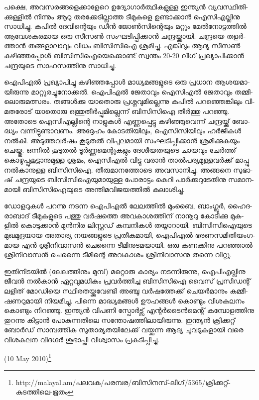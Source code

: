 ­പ­ക്ഷെ, അവ­സ­ര­ങ്ങ­ളെ­ക്കാ­ളേ­റെ ഉദ്യോ­ഗാര്‍­ത്ഥി­ക­ളു­ള്ള ഇന്ത്യന്‍ വ്യ­വ­സ്ഥി­തി­ക്കു­ള്ളില്‍ നി­ന്നും ആറു തര­ക്കേ­ടി­ല്ലാ­ത്ത 
­ടീ­മു­ക­ളെ ഉണ്ടാ­ക്കാന്‍ ഐസി­എ­ല്ലി­നു സാ­ധി­ച്ചു. കപില്‍ ദേ­വി­ന്റെ­യും ഡീന്‍ ജോണ്‍­സി­ന്റെ­യും മറ്റും മേല്‍­നോ­ട്ട­ത്തില്‍ 
ആവേ­ശ­ക­ര­മായ ഒരു സീ­സണ്‍ സം­ഘ­ടി­പ്പി­ക്കാന്‍ ചന്ദ്ര­യ്ക്കാ­യി. ചന്ദ്ര­യെ തളര്‍­ത്താന്‍ തങ്ങ­ളാ­ലാ­വും വി­ധം ബി­സി­സിഐ 
ശ്ര­മി­ച്ചു. എങ്കി­ലും ആദ്യ സീ­സണ്‍ കഴി­ഞ്ഞ­പ്പോള്‍ ബി­സി­സി­ഐ­യെ­ക്കൊ­ണ്ട് സ്വ­ന്തം 20-20 ലീ­ഗ് പ്ര­ഖ്യാ­പി­ക്കാന്‍ ചന്ദ്ര­യു­ടെ 
സാ­ഹ­സ­ത്തി­നു സാ­ധി­ച്ചു­.



ഐപിഎല്‍ പ്ര­ഖ്യാ­പി­ച്ചു കഴി­ഞ്ഞ­പ്പോള്‍ മാ­ധ്യ­മ­ങ്ങ­ളു­ടെ ഒരു പ്ര­ധാന ആശ­യ­മാ­യി­രു­ന്നു മാ­റ്റു­ര­ച്ചു­നോ­ക്കല്‍. ഐപി­എല്‍ 
ജേ­താ­വും ഐ­സി­എല്‍ ജേ­താ­വും തമ്മി­ലൊ­രു­മ­ത്സ­രം. തങ്ങള്‍­ക്കു യാ­തൊ­രു പ്ര­ശ്ന­വു­മി­ല്ലെ­ന്നു കപില്‍ പറ­ഞ്ഞെ­ങ്കി­ലും 
വി­മ­ത­രോ­ട് യാ­തൊ­രു ഒത്തു­തീര്‍­പ്പു­മി­ല്ലെ­ന്ന് ബി­സി­സിഐ തീര്‍­ത്തു പറ­ഞ്ഞു. അതോ­ടെ ഐസി­എ­ല്ലി­ന്റെ നാ­ളു­കള്‍ 
എണ്ണ­പ്പെ­ട്ടു കഴി­ഞ്ഞു­വെ­ന്ന് ചന്ദ്ര­യ്ക്ക് ബോ­ദ്ധ്യം വന്നി­ട്ടു­ണ്ടാ­വ­ണം. അദ്ദേ­ഹം കോ­ട­തി­യി­ലും, ഐസി­സി­യി­ലും ഹര്‍­ജി­കള്‍ 
നല്‍­കി. അടു­ത്ത­വര്‍­ഷം കൂ­ടു­തല്‍ വി­പു­ല­മാ­യി സം­ഘ­ടി­പ്പി­ക്കാന്‍ ശ്ര­മി­ക്കു­ക­യും ചെ­യ്തു. ഒന്നില്‍ കൂ­ടു­തല്‍ ടൂര്‍­ണ്ണ­മെ­ന്റു­ക­ളും 
ദേ­ശീ­യ­ത­യു­ടെ ചാ­യ­വും ചേര്‍­ത്ത് കൊ­ഴു­പ്പു­കൂ­ട്ടാ­നു­മു­ള്ള ശ്ര­മം, ഐസി­എല്‍ വി­ട്ടു വരാന്‍ താല്‍­പ­ര്യ­മു­ള്ള­വര്‍­ക്ക് മാ­പ്പു 
നല്‍­കാ­നു­ള്ള ബി­സി­സി­ഐ. തീ­രു­മാ­ന­ത്തോ­ടെ അവ­സാ­നി­ച്ചു. അങ്ങ­നെ സു­ഭാ­ഷ് ചന്ദ്ര­യു­ടെ ബി­സി­സി­ഐ­യു­മാ­യു­ള്ള 
പോ­രാ­ട്ടം കെ­റി പാര്‍­ക്ക­റു­ടേ­തി­നു സമാ­ന­മാ­യി ബി­സി­സി­ഐ­യു­ടെ അന്തി­മ­വി­ജ­യ­ത്തില്‍ കലാ­ശി­ച്ചു.

­ഡോ­ള­റു­കള്‍ പറ­ന്നു നട­ന്ന ഐപി­എല്‍ ലേ­ല­ത്തില്‍ മും­ബൈ, ബാം­ഗ്ലൂര്‍, ഹൈ­ദ­രാ­ബാ­ദ് ടീ­മു­ക­ളു­ടെ പത്തു വര്‍­ഷ­ത്തെ 
അവ­കാ­ശ­ത്തി­ന് നാ­നൂ­റു കോ­ടി­ക്കു മു­ക­ളില്‍ കൊ­ടു­ക്കാന്‍ മുന്‍­നിര ലി­സ്റ്റ­ഡ് കമ്പ­നി­കള്‍ തയ്യാ­റാ­യി. ബി­സി­സി­ഐ­യു­ടെ 
മു­ഖ­മു­ദ്ര­യായ അതാ­ര്യ നയ­ങ്ങ­ളു­ടെ പ്ര­തീ­ക­മാ­യി, ഐപി­എല്‍ ഭര­ണ­സ­മി­തി­യം­ഗ­മായ എന്‍ ശ്രീ­നി­വാ­സന്‍ ചെ­ന്നൈ 
ടീ­മി­നു­ട­മ­യാ­യി. ഒരു കണ­ക്കി­നു പറ­ഞ്ഞാല്‍ ശ്രീ­നി­വാ­സന്‍ ചെ­ന്നൈ ടീ­മി­ന്റെ അവ­കാ­ശം ശ്രീ­നി­വാ­സ­നു തന്നെ വി­റ്റു.

ഇ­തി­നി­ട­യില്‍ (ലേ­ല­ത്തി­നും മു­മ്പ്) മറ്റൊ­രു കാ­ര്യം നട­ന്നി­രു­ന്നു, ഐപി­എ­ല്ലി­നു ജീ­വന്‍ നല്‍­കാന്‍ ഏറ്റ­വു­മ­ധി­കം പ്ര­വര്‍­ത്തി­ച്ച 
ബി­സി­സിഐ വൈ­സ് പ്ര­സി­ഡ­ന്റ് ലളി­ത് മോ­ഡി­യെ സ്ഥി­ര­ത­യ്ക്കു­വേ­ണ്ടി അഞ്ചു വര്‍­ഷ­ത്തേ­ക്ക് ചെ­യര്‍­മാ­നും കമ്മീ­ഷ­ണ­റു­മാ­യി 
നി­യ­മി­ച്ചു. പി­ന്നെ മാ­ദ്ധ്യ­മ­ങ്ങള്‍ ഊഹ­ങ്ങള്‍ കൊ­ണ്ടും വി­ശ­ക­ല­നം കൊ­ണ്ടും നി­റ­ഞ്ഞു. ഇന്ത്യന്‍ വി­പ­ണി സ്പോര്‍­ട്സ് 
എന്റര്‍­ടൈന്‍­മെ­ന്റ് കമ്പോ­ള­ത്തി­നു തു­റ­ന്നു കി­ട്ടാന്‍ പോ­കു­ന്ന­തി­ലെ സന്തോ­ഷ­ത്തി­ലാ­യി­രു­ന്നു. ഇന്ത്യന്‍ ക്രി­ക്ക­റ്റ് ബോര്‍­ഡ് 
സാ­മ്പ­ത്തിക സു­താ­ര്യ­ത­യി­ലേ­ക്ക് വയ്ക്കു­ന്ന ആദ്യ ചു­വ­ടു­ക­ളാ­യി വരെ വി­ശ­ക­ലന വി­ദ­ഗ്ദര്‍ ശു­ഭാ­പ്തി വി­ശ്വാ­സം പ്ര­ക­ടി­പ്പി­ച്ചു.

(10 May 2010)\footnote{http://malayal.am/പലവക/പരമ്പര/ബിസിനസ്-ലീഗ്/5365/ക്രിക്കറ്റ്-കുടത്തിലെ-ഭൂതം}

\newpage
